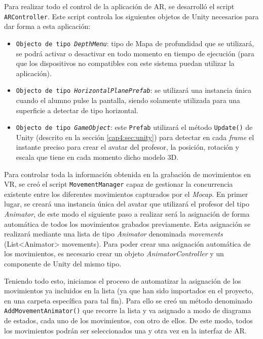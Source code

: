 Para realizar todo el control de la aplicación de AR, se desarrolló el script \texttt{ARController}. Este script controla los siguientes objetos de Unity necesarios para dar forma a esta aplicación:

\begin{itemize}
    \item \texttt{Objecto de tipo \textit{DepthMenu}}: tipo de Mapa de profundidad que se utilizará, se podrá activar o desactivar en todo momento en tiempo de ejecución (para que los dispositivos no compatibles con este sistema puedan utilizar la aplicación).
    \item \texttt{Objecto de tipo \textit{HorizontalPlanePrefab}}: se utilizará una instancia única cuando el alumno pulse la pantalla, siendo solamente utilizada para una superficie a detectar de tipo horizontal.
    \item \texttt{Objecto de tipo \textit{GameObject}}: este \texttt{Prefab} utilizará el método \texttt{Update()} de Unity (descrito en la sección \ref{cap4:sec:unity}) para detectar en cada \textit{frame} el instante preciso para crear el avatar del profesor, la posición, rotación y escala que tiene en cada momento dicho modelo 3D.
\end{itemize}

Para controlar toda la información obtenida en la grabación de movimientos en VR, se creó el script \texttt{MovementManager} capaz de gestionar la concurrencia existente entre los diferentes movimientos capturados por el \textit{Mocap}. En primer lugar, se creará una instancia única del avatar que utilizará el profesor del tipo \textit{Animator}, de este modo el siguiente paso a realizar será la asignación de forma automática de todos los movimientos grabados previamente. Esta asignación se realizará mediante una lista de tipo \textit{Animator} denominada \textit{movements} (List<Animator> movements). Para poder crear una asignación automática de los movimientos, es necesario crear un objeto \textit{AnimatorController} y un componente de Unity del mismo tipo. 

Teniendo todo esto, iniciamos el proceso de automatizar la asignación de los movimientos ya incluidos en la lista (ya que han sido importados en el proyecto, en una carpeta específica para tal fin). Para ello se creó un método denominado \texttt{AddMovementAnimator()} que recorre la lista y va asignado a modo de diagrama de estados, cada uno de los movimientos, con otro de ellos. De este modo, todos los movimientos podrán ser seleccionados una y otra vez en la interfaz de AR. 

